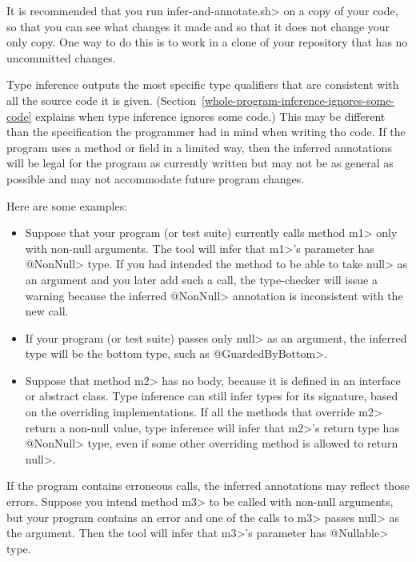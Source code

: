 It is recommended that you run \<infer-and-annotate.sh> on a copy of your
code, so that you can see what changes it made and so that it does not
change your only copy.  One way to do this is to work in a clone of your
repository that has no uncommitted changes.



Type inference outputs the most specific type qualifiers that are
consistent with all the source code it is given.
(Section~\ref{whole-program-inference-ignores-some-code}
explains when type inference ignores some code.)
This may be different than the specification the programmer had in mind
when writing tho code.
If the program uses a method or field in a limited way, then the inferred
annotations will be legal for the program as
currently written but may not be as general as possible and may not
accommodate future program changes.

Here are some examples:

\begin{itemize}
\item
Suppose that your program (or test suite) currently calls
method \<m1> only with non-null
arguments.  The tool will infer that \<m1>'s parameter has
\<@NonNull> type.  If you had intended the method to be able to
take \<null> as an argument and you later add such a call, the type-checker
will issue a warning because the inferred \<@NonNull>
annotation is inconsistent with the new call.

\item
If your program (or test suite) passes only \<null> as an argument, the
inferred type will be the bottom type, such as \<@GuardedByBottom>.

\item
Suppose that method \<m2> has no body, because it is defined in an interface or
abstract class.
Type inference can still infer types for its signature, based on the
overriding implementations.
If all the methods that override \<m2> return a non-null value, type
inference will infer that \<m2>'s return type has \<@NonNull> type, even if
some other overriding method is allowed to return
\<null>.

\end{itemize}

If the program contains erroneous calls, the
inferred annotations may reflect those errors.
Suppose you intend method \<m3> to be called with
non-null arguments, but your program contains an error and one of the calls
to \<m3> passes \<null> as the argument.  Then the tool will infer that
\<m3>'s parameter has \<@Nullable> type.

